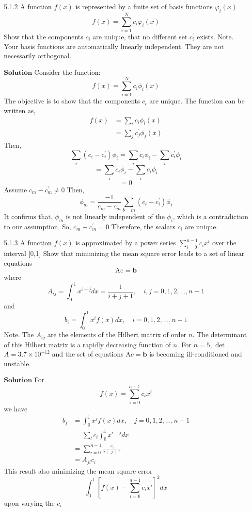 \documentclass{article}
\begin{document}
\begin{flushleft}
\begin{mybox}{5.1.2}
A function $f(x)$ is represented by a finite set of basis functions $\varphi_{i}(x)$
$$
f(x)=\sum_{i=1}^{N} c_{i} \varphi_{i}(x)
$$
Show that the components $c_{i}$ are unique, that no different set $c_{i}^{\prime}$ exists.
Note. Your basis functions are automatically linearly independent. They are not necessarily orthogonal.
\end{mybox}
$\boxed{\textbf{Solution}}$ Consider the function:
$$f(x)=\sum_{i=1}^{N} c_{i} \phi_{i}(x)$$
The objective is to show that the components $c_{i}$ are unique.
The function can be written as,
$$
\begin{aligned}
f(x) &=\sum_{i} c_{i} \phi_{i}(x) \\
&=\sum_{j} c_{j}^{\prime} \phi_{j}(x)
\end{aligned}
$$
Then,
$$\sum_{i}\left(c_{i}-c_{i}^{\prime}\right) \phi_{i}=\sum_{i} c_{i} \phi_{i}-\sum_{i} c_{i}^{\prime} \phi_{i}$$
$$=\sum_{i} c_{i} \phi_{i}-\sum_{i} c_{i} \phi_{i}$$
$$=0$$
Assume $c_{m}-c_{m}^{\prime} \neq 0$ Then,
$$
\phi_{m}=\frac{-1}{c_{m}-c_{m}} \sum_{b=m}\left(c_{i}-c_{i}^{\prime}\right) \phi_{i}
$$
It confirms that, $\phi_{m}$ is not linearly independent of the $\phi_{i}$, which is a contradiction to our assumption. So, $c_{m}-c_{m}^{\prime}=0$ Therefore, the scalars $c_{i}$ are unique.

\newpage

\begin{mybox}{5.1.3}
A function $f(x)$ is approximated by a power series $\sum_{i=0}^{n-1} c_{i} x^{i}$ over the interval [0,1] Show that minimizing the mean square error leads to a set of linear equations
$$
\mathrm{Ac}=\mathbf{b}
$$
where
$$
A_{i j}=\int_{0}^{1} x^{i+j} d x=\frac{1}{i+j+1}, \quad i, j=0,1,2, \ldots, n-1
$$
and
$$
b_{i}=\int_{0}^{1} x^{i} f(x) d x, \quad i=0,1,2, \ldots, n-1
$$
Note. The $A_{i j}$ are the elements of the Hilbert matrix of order $n$. The determinant of this Hilbert matrix is a rapidly decreasing function of $n .$ For $n=5,$ det $A=3.7 \times 10^{-12}$ and the set of equations $\mathrm{A} c=\mathbf{b}$ is becoming ill-conditioned and unstable.
\end{mybox}
$\boxed{\textbf{Solution}}$ For 
$$f(x)=\sum_{i=0}^{n-1} c_{i} x^{i}$$
we have
$$
\begin{aligned}
b_{j} &=\int_{0}^{1} x^{j} f(x) d x, \quad j=0,1,2, \ldots, n-1 \\
&=\sum_{l} c_{i} \int_{0}^{1} x^{i+j} d x \\
&=\sum_{i=0}^{n-1} \frac{c_{i}}{i+j+1} \\
&=A_{j i} c_{i}
\end{aligned}
$$
This result also minimizing the mean square error $$\int_{0}^{1}\left[f(x)-\sum_{i=0}^{n-1} c_{i} x^{i}\right]^{2} d x$$ 
upon varying the $c_{i}$


\end{flushleft}
\end{document}
